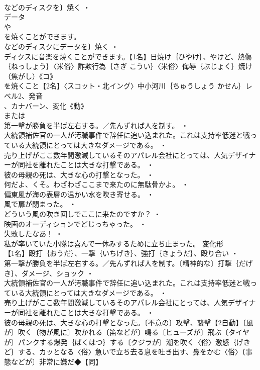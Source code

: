 \documentclass[8pt]{extreport}
\begin{document}
\begin{CJK}{UTF8}{min}
\\	などのディスクを〕焼く ・
\\	データ
\\	や
\\	を焼くことができます。
\\	などのディスクにデータを〕焼く ・
\\	ディクスに音楽を焼くことができます。【1名】日焼け｛ひやけ｝、やけど、熱傷｛ねっしょう｝〈米俗〉詐欺行為｛さぎ こうい｝〈米俗〉侮辱｛ぶじょく｝焼け（焦がし）《コ》
\\	を焼くこと【2名】〈スコット・北イング〉中小河川｛ちゅうしょう かせん｝レベル2、発音
\\	、カナバーン、変化《動》
\\	または
\\	第一撃が勝負を半ば左右する。／先んずれば人を制す。 ・
\\	大統領補佐官の一人が汚職事件で辞任に追い込まれた。これは支持率低迷と戦っている大統領にとっては大きなダメージである。 ・
\\	売り上げがここ数年間激減しているそのアパレル会社にとっては、人気デザイナーが同社を離れたことは大きな打撃である。 ・
\\	彼の母親の死は、大きな心の打撃となった。 ・
\\	何だよ、くそ。わざわざここまで来たのに無駄骨かよ。 ・
\\	偏東風が海の表層の温かい水を吹き寄せる。 ・
\\	風で扉が閉まった。 ・
\\	どういう風の吹き回しでここに来たのですか？ ・
\\	映画のオーディションでどじっちゃった。 ・
\\	失敗したなあ！ ・
\\	私が率いていた小隊は喜んで一休みするために立ち止まった。	変化形 
\\	【1名】殴打｛おうだ｝、一撃｛いちげき｝、強打｛きょうだ｝、殴り合い ・
\\	第一撃が勝負を半ば左右する。／先んずれば人を制す。〔精神的な〕打撃｛だげき｝、ダメージ、ショック ・
\\	大統領補佐官の一人が汚職事件で辞任に追い込まれた。これは支持率低迷と戦っている大統領にとっては大きなダメージである。 ・
\\	売り上げがここ数年間激減しているそのアパレル会社にとっては、人気デザイナーが同社を離れたことは大きな打撃である。 ・
\\	彼の母親の死は、大きな心の打撃となった。〔不意の〕攻撃、襲撃【2自動】〔風が〕吹く〔物が風に〕吹かれる〔笛などが〕鳴る〔ヒューズが〕飛ぶ〔タイヤが〕パンクする爆発｛ばくはつ｝する〔クジラが〕潮を吹く〈俗〉激怒｛げきど｝する、カッとなる〈俗〉急いで立ち去る息を吐き出す、鼻をかむ〈俗〉〔事態などが〕非常に嫌だ◆【同】

\end{CJK}
\end{document}
